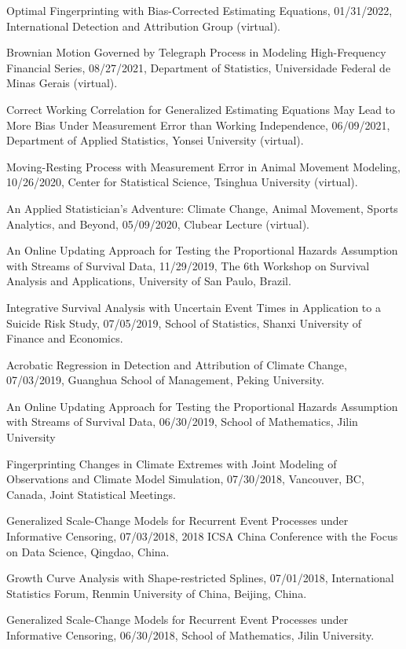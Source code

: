 \documentclass[Statistics]{vita}
\begin{document}
\begin{vita}
\begin{InvitedTalksLectures}
\begin{InvitedTalks}
  \item Optimal Fingerprinting with Bias-Corrected Estimating Equations, 01/31/2022, International Detection and Attribution Group (virtual).
  \item Brownian Motion Governed by Telegraph Process in Modeling High-Frequency Financial Series, 08/27/2021, Department of Statistics, Universidade Federal de Minas Gerais (virtual).
  \item Correct Working Correlation for Generalized Estimating Equations May Lead to More Bias Under Measurement Error than Working Independence, 06/09/2021, Department of Applied Statistics, Yonsei University (virtual).
  \item Moving-Resting Process with Measurement Error in Animal Movement Modeling, 10/26/2020, Center for Statistical Science, Tsinghua University (virtual).
  \item An Applied Statistician's Adventure: Climate Change, Animal Movement, Sports Analytics, and Beyond, 05/09/2020, Clubear Lecture (virtual).
  \item An Online Updating Approach for Testing the Proportional Hazards Assumption with Streams of Survival Data, 11/29/2019, The 6th Workshop on Survival Analysis and Applications, University of San Paulo, Brazil.
  \item Integrative Survival Analysis with Uncertain Event Times in Application to a Suicide Risk Study, 07/05/2019, School of Statistics, Shanxi University of Finance and Economics.
  \item Acrobatic Regression in Detection and Attribution of Climate Change, 07/03/2019, Guanghua School of Management, Peking University.
  \item An Online Updating Approach for Testing the Proportional Hazards Assumption with Streams of Survival Data, 06/30/2019, School of Mathematics, Jilin University
  \item Fingerprinting Changes in Climate Extremes with Joint Modeling of Observations and Climate Model Simulation, 07/30/2018, Vancouver, BC, Canada, Joint Statistical Meetings.
  \item Generalized Scale-Change Models for Recurrent Event Processes under Informative Censoring, 07/03/2018, 2018 ICSA China Conference with the Focus on Data Science, Qingdao, China.
  \item Growth Curve Analysis with Shape-restricted Splines, 07/01/2018, International Statistics Forum, Renmin University of China, Beijing, China.
  \item Generalized Scale-Change Models for Recurrent Event Processes under Informative Censoring, 06/30/2018, School of Mathematics, Jilin University.

\end{InvitedTalks}
\end{InvitedTalksLectures}
\end{vita}
\end{document}
